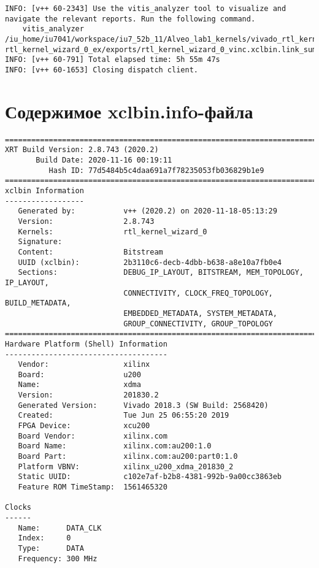 \begin{lstlisting}[label=code:log_file, caption=Содержимое log-файла, basicstyle=\tiny]
INFO: [v++ 60-2343] Use the vitis_analyzer tool to visualize and navigate the relevant reports. Run the following command. 
    vitis_analyzer /iu_home/iu7041/workspace/iu7_52b_11/Alveo_lab1_kernels/vivado_rtl_kernel/ rtl_kernel_wizard_0_ex/exports/rtl_kernel_wizard_0_vinc.xclbin.link_summary 
INFO: [v++ 60-791] Total elapsed time: 5h 55m 47s
INFO: [v++ 60-1653] Closing dispatch client.
\end{lstlisting}

\chapter{Содержимое xclbin.info-файла}
\label{cha:appendix1}

\begin{lstlisting}[label=code:info_file, caption=Содержимое xclbin.info-файла, basicstyle=\tiny]
==============================================================================
XRT Build Version: 2.8.743 (2020.2)
       Build Date: 2020-11-16 00:19:11
          Hash ID: 77d5484b5c4daa691a7f78235053fb036829b1e9
==============================================================================
xclbin Information
------------------
   Generated by:           v++ (2020.2) on 2020-11-18-05:13:29
   Version:                2.8.743
   Kernels:                rtl_kernel_wizard_0
   Signature:              
   Content:                Bitstream
   UUID (xclbin):          2b3110c6-decb-4dbb-b638-a8e10a7fb0e4
   Sections:               DEBUG_IP_LAYOUT, BITSTREAM, MEM_TOPOLOGY, IP_LAYOUT, 
                           CONNECTIVITY, CLOCK_FREQ_TOPOLOGY, BUILD_METADATA, 
                           EMBEDDED_METADATA, SYSTEM_METADATA, 
                           GROUP_CONNECTIVITY, GROUP_TOPOLOGY
==============================================================================
Hardware Platform (Shell) Information
-------------------------------------
   Vendor:                 xilinx
   Board:                  u200
   Name:                   xdma
   Version:                201830.2
   Generated Version:      Vivado 2018.3 (SW Build: 2568420)
   Created:                Tue Jun 25 06:55:20 2019
   FPGA Device:            xcu200
   Board Vendor:           xilinx.com
   Board Name:             xilinx.com:au200:1.0
   Board Part:             xilinx.com:au200:part0:1.0
   Platform VBNV:          xilinx_u200_xdma_201830_2
   Static UUID:            c102e7af-b2b8-4381-992b-9a00cc3863eb
   Feature ROM TimeStamp:  1561465320

Clocks
------
   Name:      DATA_CLK
   Index:     0
   Type:      DATA
   Frequency: 300 MHz


\end{lstlisting}
